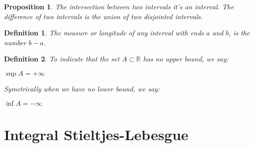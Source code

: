 \documentclass{article}
\newtheorem{definition}{Definition}[section]
\newtheorem{prop}{Proposition}[section]
\begin{document}
	\begin{prop}
		The intersection between two intervals it's an interval. The difference of
		two intervals is the union of two disjointed intervals.
	\end{prop}

	\begin{definition}
		The measure or longitude of any interval with ends $a$ and $b$, is the
		number $b-a$.
	\end{definition}
	\begin{definition}
		To indicate that the set $A \subset \mathbb{R}$ has no upper bound, we say:
		\begin{center}
		$\sup{} A = +\infty$\\
		\end{center}
		Symetrically when we have no lower bound, we say:
		\begin{center}
		$\inf A = -\infty$
		\end{center}
	\end{definition}
	
	
	
		
	\section{Integral Stieltjes-Lebesgue}
\end{document}
